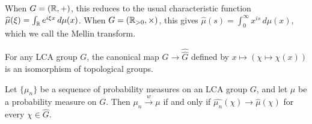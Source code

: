 When $G = (\mathbb{R}, +)$, this reduces to the usual characteristic function $\widehat{\mu}(\xi) = \int_{\mathbb{R}} e^{i\xi x}\, d\mu(x)$. When $G = (\mathbb{R}_{>0}, \times)$, this gives $\widehat{\mu}(s) = \int_0^\infty x^{is}\, d\mu(x)$, which we call the Mellin transform.

\begin{theorem}\label{thm:pontryagin}
For any LCA group $G$, the canonical map $G \to \widehat{\widehat{G}}$ defined by $x \mapsto (\chi \mapsto \chi(x))$ is an isomorphism of topological groups.
\end{theorem}

\begin{theorem}\label{thm:levy}
Let $\{\mu_n\}$ be a sequence of probability measures on an LCA group $G$, and let $\mu$ be a probability measure on $G$. Then $\mu_n \xrightarrow{w} \mu$ if and only if $\widehat{\mu_n}(\chi) \to \widehat{\mu}(\chi)$ for every $\chi \in \widehat{G}$.
\end{theorem}

